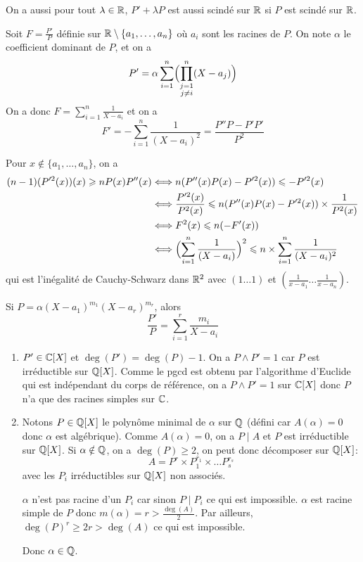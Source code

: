 \begin{remark}
	On a aussi pour tout $\lambda\in\mathbb{R}$, $P'+\lambda P$ est aussi scindé sur $\mathbb{R}$ si $P$ est scindé sur $\mathbb{R}$.
\end{remark}

\begin{solution}
	Soit $F=\frac{P'}{P}$ définie sur $\mathbb{R}\setminus\{a_{1},\dots,a_{n}\}$ où $a_{i}$ sont les racines de $P$. On note $\alpha$ le coefficient dominant de $P$, et on a 
	$$P'=\alpha\sum_{i=1}^{n}\Bigl(\prod_{\substack{j=1\\ j\neq i}}^{n}(X-a_{j})\Bigr)$$
	On a donc $F=\sum_{i=1}^{n}\frac{1}{X-a_{i}}$ et on a 
	$$F'=-\sum_{i=1}^{n}\frac{1}{(X-a_{i})^{2}}=\frac{P''P-P'P'}{P^{2}}$$

	Pour $x\notin\{a_{1},\dots,a_{n}\}$, on a 
	\begin{align*}
		(n-1)(P'^{2}(x))(x)\geqslant nP(x)P''(x)
		&\Longleftrightarrow n(P''(x)P(x)-P'^{2}(x))\leqslant-P'^{2}(x)\\
		&\Longleftrightarrow \frac{P'^{2}(x)}{P^{2}(x)}\leqslant n(P''(x)P(x)-P'^{2}(x))\times\frac{1}{P^{2}(x)}\\
		&\Longleftrightarrow F^{2}(x)\leqslant n(-F'(x))\\
		&\Longleftrightarrow\Bigl(\sum_{i=1}^{n}\frac{1}{(X-a_{i})}\Bigr)^{2}\leqslant n\times\sum_{i=1}^{n}\frac{1}{(X-a_{i})^{2}}
	\end{align*}
	qui est l'inégalité de Cauchy-Schwarz dans $\mathbb{R}^{2}$ avec $(1\dots 1)$ et $(\frac{1}{x-a_{1}}\dots\frac{1}{x-a_{n}})$.
\end{solution}

\begin{remark}
	Si $P=\alpha(X-a_{1})^{m_{1}}(X-a_{r})^{m_{r}}$, alors 
	$$\frac{P'}{P}=\sum_{i=1}^{r}\frac{m_{i}}{X-a_{i}}$$
\end{remark}

\begin{solution}
	\phantom{}
	\begin{enumerate}
		\item $P'\in\mathbb{C}[X]$ et $\deg(P')=\deg(P)-1$. On a $P\wedge P'=1$ car $P$ est irréductible sur $\mathbb{Q}[X]$. Comme le pgcd est obtenu par l'algorithme d'Euclide qui est indépendant du corps de référence, on a $P\wedge P'=1$ sur $\mathbb{C}[X]$ donc $P$ n'a que des racines simples sur $\mathbb{C}$.
		\item Notons $P\in\mathbb{Q}[X]$ le polynôme minimal de $\alpha$ sur $\mathbb{Q}$ (défini car $A(\alpha)=0$ donc $\alpha$ est algébrique). Comme $A(\alpha)=0$, on a $P\mid A$ et $P$ est irréductible sur $\mathbb{Q}[X]$. Si $\alpha\notin\mathbb{Q}$, on a $\deg(P)\geqslant2$, on peut donc décomposer sur $\mathbb{Q}[X]$:
		$$A=P^{r}\times P_{1}^{r_{1}}\times\dots P_{s}^{r_{s}}$$
		avec les $P_{i}$ irréductibles sur $\mathbb{Q}[X]$ non associés.

		$\alpha$ n'est pas racine d'un $P_{i}$ car sinon $P\mid P_{i}$ ce qui est impossible. $\alpha$ est racine simple de $P$ donc $m(\alpha)=r>\frac{\deg(A)}{2}$. Par ailleurs, $\deg(P)^{r}\geqslant2r>\deg(A)$ ce qui est impossible.

		Donc $\alpha\in\mathbb{Q}$.
	\end{enumerate}
\end{solution}

